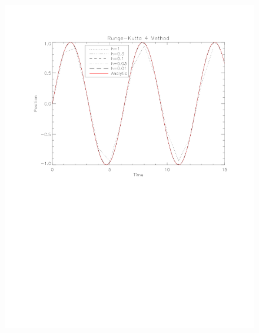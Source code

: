 \documentclass[11pt]{article}
\begin{document}
\begin{figure}
\centering
\includegraphics[scale = 0.7]{RK4.pdf}
\caption{}
\end{figure}
\end{document}
